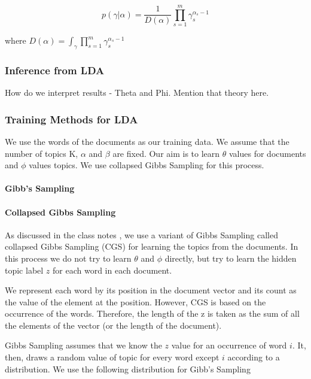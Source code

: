 \documentclass[11pt,a4paper,oneside]{article}
\begin{document}
\begin{equation}
p(\gamma|\alpha) = \frac{1}{D(\alpha)}\prod^m_{s=1}\gamma^{\alpha_s - 1}_s
\end{equation}

where ${D(\alpha)} = \int_\gamma \prod^m_{s=1}\gamma^{\alpha_s - 1}_s$

\subsubsection{Inference from LDA}
How do we interpret results - Theta and Phi.
Mention that theory here.

\subsubsection{Training Methods for LDA}

We use the words of the documents as our training data. We assume that the number of topics K, $\alpha$ and $\beta$ are fixed. Our aim is to learn $\theta$ values for documents and $\phi$ values topics. We use collapsed Gibbs Sampling for this process.

\paragraph*{Gibb's Sampling}

\paragraph*{Collapsed Gibbs Sampling}

As discussed in the class notes \cite{classNotes}, we use a variant of Gibbs Sampling called collapsed Gibbs Sampling (CGS) for learning the topics from the documents. In this process we do not try to learn $\theta$ and $\phi$ directly, but try to learn the hidden topic label $z$ for each word in each document.

We represent each word by its position in the document vector and its count as the value of the element at the position. However, CGS is based on the occurrence of the words. Therefore, the length of the z is taken as the sum of all the elements of the vector (or the length of the document).

Gibbs Sampling assumes that we know the $z$ value for an occurrence of word $i$. It, then, draws a random value of topic for every word except $i$ according to a distribution. We use the following distribution for Gibb's Sampling
\end{document}
